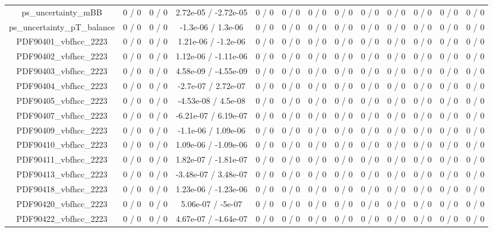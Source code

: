 \documentclass[10pt]{article}
\begin{document}
\begin{table}[htbp]
\begin{center}
\begin{tabular}{|c|c|c|c|c|c|c|c|c|c|c|c|c|}
  ps_uncertainty_mBB & 0 / 0 & 0 / 0 & 2.72e-05 / -2.72e-05 & 0 / 0 & 0 / 0 & 0 / 0 & 0 / 0 & 0 / 0 & 0 / 0 & 0 / 0 & 0 / 0 & 0 / 0 \\ 
  ps_uncertainty_pT_balance & 0 / 0 & 0 / 0 & -1.3e-06 / 1.3e-06 & 0 / 0 & 0 / 0 & 0 / 0 & 0 / 0 & 0 / 0 & 0 / 0 & 0 / 0 & 0 / 0 & 0 / 0 \\ 
  PDF90401_vbfhcc_2223 & 0 / 0 & 0 / 0 & 1.21e-06 / -1.2e-06 & 0 / 0 & 0 / 0 & 0 / 0 & 0 / 0 & 0 / 0 & 0 / 0 & 0 / 0 & 0 / 0 & 0 / 0 \\ 
  PDF90402_vbfhcc_2223 & 0 / 0 & 0 / 0 & 1.12e-06 / -1.11e-06 & 0 / 0 & 0 / 0 & 0 / 0 & 0 / 0 & 0 / 0 & 0 / 0 & 0 / 0 & 0 / 0 & 0 / 0 \\ 
  PDF90403_vbfhcc_2223 & 0 / 0 & 0 / 0 & 4.58e-09 / -4.55e-09 & 0 / 0 & 0 / 0 & 0 / 0 & 0 / 0 & 0 / 0 & 0 / 0 & 0 / 0 & 0 / 0 & 0 / 0 \\ 
  PDF90404_vbfhcc_2223 & 0 / 0 & 0 / 0 & -2.7e-07 / 2.72e-07 & 0 / 0 & 0 / 0 & 0 / 0 & 0 / 0 & 0 / 0 & 0 / 0 & 0 / 0 & 0 / 0 & 0 / 0 \\ 
  PDF90405_vbfhcc_2223 & 0 / 0 & 0 / 0 & -4.53e-08 / 4.5e-08 & 0 / 0 & 0 / 0 & 0 / 0 & 0 / 0 & 0 / 0 & 0 / 0 & 0 / 0 & 0 / 0 & 0 / 0 \\ 
  PDF90407_vbfhcc_2223 & 0 / 0 & 0 / 0 & -6.21e-07 / 6.19e-07 & 0 / 0 & 0 / 0 & 0 / 0 & 0 / 0 & 0 / 0 & 0 / 0 & 0 / 0 & 0 / 0 & 0 / 0 \\ 
  PDF90409_vbfhcc_2223 & 0 / 0 & 0 / 0 & -1.1e-06 / 1.09e-06 & 0 / 0 & 0 / 0 & 0 / 0 & 0 / 0 & 0 / 0 & 0 / 0 & 0 / 0 & 0 / 0 & 0 / 0 \\ 
  PDF90410_vbfhcc_2223 & 0 / 0 & 0 / 0 & 1.09e-06 / -1.09e-06 & 0 / 0 & 0 / 0 & 0 / 0 & 0 / 0 & 0 / 0 & 0 / 0 & 0 / 0 & 0 / 0 & 0 / 0 \\ 
  PDF90411_vbfhcc_2223 & 0 / 0 & 0 / 0 & 1.82e-07 / -1.81e-07 & 0 / 0 & 0 / 0 & 0 / 0 & 0 / 0 & 0 / 0 & 0 / 0 & 0 / 0 & 0 / 0 & 0 / 0 \\ 
  PDF90413_vbfhcc_2223 & 0 / 0 & 0 / 0 & -3.48e-07 / 3.48e-07 & 0 / 0 & 0 / 0 & 0 / 0 & 0 / 0 & 0 / 0 & 0 / 0 & 0 / 0 & 0 / 0 & 0 / 0 \\ 
  PDF90418_vbfhcc_2223 & 0 / 0 & 0 / 0 & 1.23e-06 / -1.23e-06 & 0 / 0 & 0 / 0 & 0 / 0 & 0 / 0 & 0 / 0 & 0 / 0 & 0 / 0 & 0 / 0 & 0 / 0 \\ 
  PDF90420_vbfhcc_2223 & 0 / 0 & 0 / 0 & 5.06e-07 / -5e-07 & 0 / 0 & 0 / 0 & 0 / 0 & 0 / 0 & 0 / 0 & 0 / 0 & 0 / 0 & 0 / 0 & 0 / 0 \\ 
  PDF90422_vbfhcc_2223 & 0 / 0 & 0 / 0 & 4.67e-07 / -4.64e-07 & 0 / 0 & 0 / 0 & 0 / 0 & 0 / 0 & 0 / 0 & 0 / 0 & 0 / 0 & 0 / 0 & 0 / 0 \\ 

\end{tabular}
\end{center}
\end{table}
\end{document}
